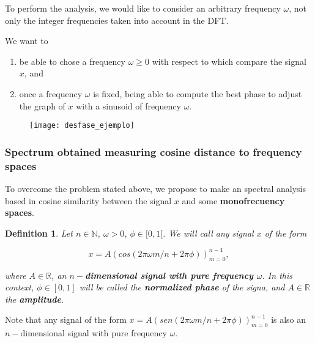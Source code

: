 \documentclass[]{beamer}
\newtheorem{defi}{\bf Definition}
\theoremstyle{definition}
\newcommand{\IR}{\mathbb{R}}
\newcommand{\IN}{\mathbb{N}}
\begin{document}
\begin{frame}

To perform the analysis,
we would like to consider an arbitrary frequency $\omega$, not only
the integer frequencies taken into account in the DFT.

We want to 
\begin{enumerate}
	\item be able to chose a frequency $\omega \geq 0$ with respect to which
	compare the signal $x$, and
	
	\item once a frequency $\omega$ is fixed, being able to compute the 
	best phase to adjust the graph of $x$ with a sinusoid of frequency $\omega$.
\end{enumerate}
\end{frame}


\begin{frame}
\begin{figure}[h]
\texttt{[image: desfase\_ejemplo]}
\end{figure}
\end{frame}


\begin{frame}
\frametitle{Spectrum obtained measuring cosine distance to frequency spaces}

To overcome the problem stated above, we propose to make
an spectral analysis based in cosine similarity between the signal
$x$ and some \textbf{monofrecuency spaces}.

\end{frame}



\begin{frame}
\begin{defi}
Let $n \in \IN$,  $\omega>0$, $\phi \in [0,1[$.  
We will call any signal $x$ of the form

\begin{equation}
x =A \left(
cos \left(  2 \pi \omega m/n + 2 \pi \phi
\right)
\right)_{m=0}^{n-1},
\end{equation}

\noindent
where $A \in \IR$, an
\textbf{$n-$dimensional signal with pure frequency
$\omega$}. 
In this context, 
$\phi \in [0,1]$ will be called the \textbf{normalized phase}
of the signa, and $A \in \IR$ the \textbf{amplitude}.
\end{defi}

Note that any signal of the form 
$x =A \left(
sen \left(  2 \pi \omega m/n + 2 \pi \phi
\right)
\right)_{m=0}^{n-1}$ is also an 
$n-$dimensional signal with pure frequency
$\omega$.
\end{frame}
\end{document}
